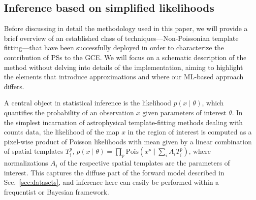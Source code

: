 \documentclass[prd,aps,10pt,nofootinbib,twocolumn,superscriptaddress,preprintnumbers,balancelastpage,longbibliography]{revtex4-1}
\begin{document}
\subsection{Inference based on simplified likelihoods}
\label{sec:likelihood-methods}

Before discussing in detail the methodology used in this paper, we will provide a brief overview of an established class of techniques---Non-Poissonian template fitting---that have been successfully deployed in order to characterize the contribution of PSs to the GCE. 
We will focus on a schematic description of the method without delving into details of the implementation, aiming to highlight the elements that introduce approximations and where our ML-based approach differs.

A central object in statistical inference is the likelihood $p(x\mid \theta)$, which quantifies the probability of an observation $x$ given parameters of interest $\theta$. In the simplest incarnation of astrophysical template-fitting methods dealing with counts data, the likelihood of the map $x$ in the region of interest is computed as a pixel-wise product of Poisson likelihoods with mean given by a linear combination of spatial templates $T_i^p$, $p(x\mid \theta) = \prod_p \mathrm{Pois}\left(x^p\mid\sum_i A_i T_i^p\right)$, where normalizations $A_i$ of the respective spatial templates are the parameters of interest. This captures the diffuse part of the forward model described in Sec.~\ref{sec:datasets}, and inference here can easily be performed within a frequentist or Bayesian framework. 
\end{document}

